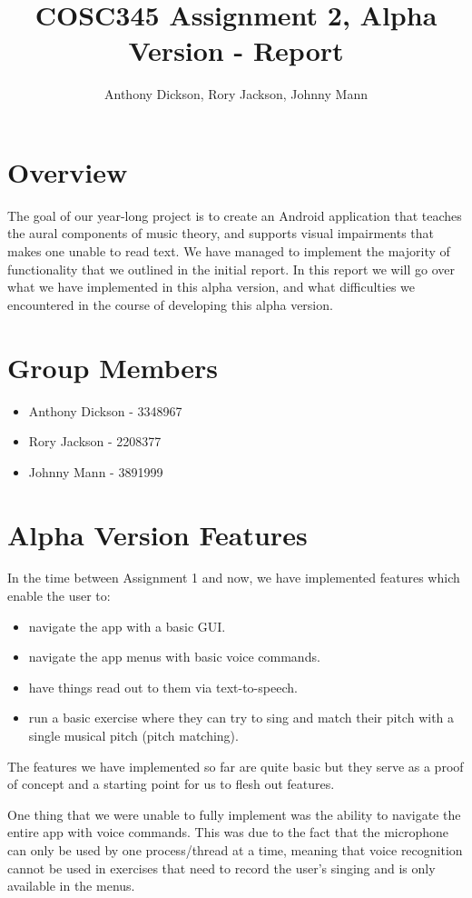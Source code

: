 \documentclass[10pt,a4paper]{article}
\author{Anthony Dickson, Rory Jackson, Johnny Mann}
\title{COSC345 Assignment 2, Alpha Version - Report}
\begin{document}
	
\maketitle

\section{Overview}
The goal of our year-long project is to create an Android application that teaches the aural components of music theory, and supports visual impairments that makes one unable to read text. We have managed to implement the majority of functionality that we outlined in the initial report. In this report we will go over what we have implemented in this alpha version, and what difficulties we encountered in the course of developing this alpha version.

\section{Group Members}
\begin{itemize}
	\item Anthony Dickson - 3348967
	\item Rory Jackson - 2208377
	\item Johnny Mann - 3891999
\end{itemize}

\section{Alpha Version Features}
In the time between Assignment 1 and now, we have implemented features which enable the user to:
\begin{itemize}
	\item navigate the app with a basic GUI.
	\item navigate the app menus with basic voice commands.
	\item have things read out to them via text-to-speech.
	\item run a basic exercise where they can try to sing and match their pitch with a single musical pitch (pitch matching).
\end{itemize}
The features we have implemented so far are quite basic but they serve as a proof of concept and a starting point for us to flesh out features. 

One thing that we were unable to fully implement was the ability to navigate the entire app with voice commands. This was due to the fact that the microphone can only be used by one process/thread at a time, meaning that voice recognition cannot be used in exercises that need to record the user's singing and is only available in the menus.
\end{document}
